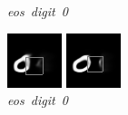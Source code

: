 \documentclass{article} %
\begin{document}
\begin{figure}[t]
  \caption{\mbox{\textit{eos digit 0}}}
\endminipage\hfill
{}
  \includegraphics[width=\linewidth]{figures/1-0-9.png}
  \caption{\mbox{\textit{eos digit 0}}}
\endminipage\hfill
{}
  \includegraphics[width=\linewidth]{figures/1-0-12.png}

\end{figure}
\end{document}
